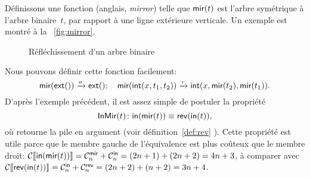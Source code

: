 Définissons une fonction  (anglais,
\emph{mirror}) telle que \(\fun{mir}(t)\) est l'arbre symétrique à
l'arbre binaire~\(t\), par rapport à une ligne extérieure
verticale. Un exemple est montré à la \fig~\vref{fig:mirror}.
\begin{figure}[b]
\centering
\subfloat[\(t\)]{\texttt{[image: bt\_ex2]}}
\qquad
{}
\caption{Réfléchissement d'un arbre binaire}
\label{fig:mirror}
\end{figure}
Nous pouvons définir cette fonction facilement:
\begin{equation*}
\fun{mir}(\fun{ext}()) \xrightarrow{\smash{\sigma}} \fun{ext}();
\quad
\fun{mir}(\fun{int}(x,t_1,t_2)) \xrightarrow{\smash{\tau}}
\fun{int}(x,\fun{mir}(t_2),\fun{mir}(t_1)).
\end{equation*}
D'après l'exemple précédent, il est assez simple de postuler la
propriété
\begin{equation*}
\pred{InMir}{t} \colon \fun{in}(\fun{mir}(t)) \equiv
\fun{rev}(\fun{in}(t)),\index{InMir@\predName{InMir}}
\end{equation*}
où 
retourne la pile en argument (voir
définition~\eqref{def:rev} ). Cette propriété est
utile parce que le membre gauche de l'équivalence est plus coûteux que
le membre droit: \(\Call{\fun{in}(\fun{mir}(t))} = \C{\fun{mir}}{n} +
\C{\fun{in}}{n} = (2n+1) + (2n+2) = 4n + 3\), à comparer avec
\(\Call{\fun{rev}(\fun{in}(t))} = \C{\fun{in}}{n} + \C{\fun{rev}}{n} =
(2n+2) + (n+2) = 3n + 4\).

